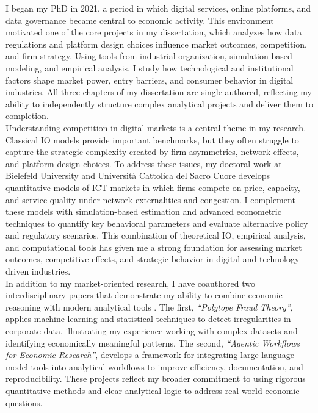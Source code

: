 \documentclass{nfr}
\begin{document}
I began my PhD in 2021, a period in which digital services, online platforms, and data governance became central to economic activity. 
This environment motivated one of the core projects in my dissertation, which analyzes how data regulations and platform design choices influence market outcomes, competition, and firm strategy. 
Using tools from industrial organization, simulation-based modeling, and empirical analysis, I study how technological and institutional factors shape market power, entry barriers, and consumer behavior in digital industries. 
All three chapters of my dissertation are single-authored, reflecting my ability to independently structure complex analytical projects and deliver them to completion.\\

Understanding competition in digital markets is a central theme in my research. 
Classical IO models provide important benchmarks, but they often struggle to capture the strategic complexity created by firm asymmetries, network effects, and platform design choices. 
To address these issues, my doctoral work at Bielefeld University and Università Cattolica del Sacro Cuore develops quantitative models of ICT markets in which firms compete on price, capacity, and service quality under network externalities and congestion. 
I complement these models with simulation-based estimation and advanced econometric techniques to quantify key behavioral parameters and evaluate alternative policy and regulatory scenarios. 
This combination of theoretical IO, empirical analysis, and computational tools has given me a strong foundation for assessing market outcomes, competitive effects, and strategic behavior in digital and technology-driven industries.\\

In addition to my market-oriented research, I have coauthored two interdisciplinary papers that demonstrate my ability to combine economic reasoning with modern analytical tools \citep{Zhao2025, Dawid2025}. 
The first, \textit{“Polytope Fraud Theory”}, applies machine-learning and statistical techniques to detect irregularities in corporate data, illustrating my experience working with complex datasets and identifying economically meaningful patterns. 
The second, \textit{“Agentic Workflows for Economic Research”}, develops a framework for integrating large-language-model tools into analytical workflows to improve efficiency, documentation, and reproducibility. 
These projects reflect my broader commitment to using rigorous quantitative methods and clear analytical logic to address real-world economic questions.\\
\end{document}
